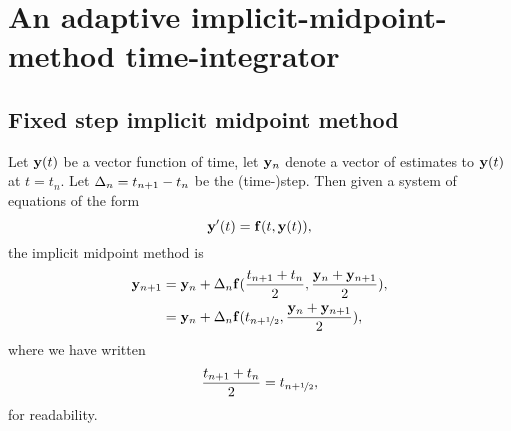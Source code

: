 


\newcommand{\thfx}[1]{t_{#1+\half}}
\newcommand{\thf}{\thfx{n}}

\newcommand{\yvhfx}[1]{\yv(\thfx{#1})}
\newcommand{\yvhf}{\yvhfx{n}}

\newcommand{\dfdy}{F}
\newcommand{\dfdyhfx}[1]{\dfdy_{#1+\half}}
\newcommand{\dfdyhf}{\dfdyhfx{n}}

\newcommand{\ymiderr}{a_n}



\section{An adaptive implicit-midpoint-method time-integrator}





\subsection{Fixed step implicit midpoint method}

Let $\mathbf{y}(t)$ be a vector function of time, let $\mathbf{y}_n$ denote a vector of estimates to $\mathbf{y}(t)$ at $t = t_n$.
Let $\Delta_{n} = t_{n+1} - t_n$ be the (time-)step.
Then given a system of equations of the form
\begin{equation}
  \mathbf{y}'(t) = {\mathbf{f}}(t, \mathbf{y}(t)),
  \label{eq:43}
\end{equation}
the implicit midpoint method is
\begin{align}
  \yv_{n+1} &= \yv_n + \dtn \fv(\frac{t_{n+1} + t_n}{2}, \frac{\yv_n + \yv_{n+1}}{2}), \notag\\
  &= \yv_n + \dtn \fv(\thf, \frac{\yv_n + \yv_{n+1}}{2}),
  \label{eq:basic-midpoint}
\end{align}
where we have written
\begin{equation}
  \frac{t_{n+1} + t_n}{2} = \thf,
\end{equation}
for readability.

